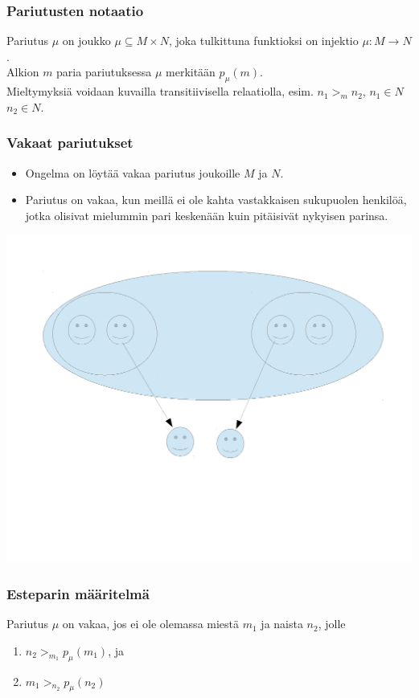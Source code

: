 \documentclass[table]{beamer}
\begin{document}
  \begin{frame}
  	\frametitle{Pariutusten notaatio}
  	\fontsize{14pt}{7.2}\selectfont
  	Pariutus $\mu$ on joukko $\mu \subseteq M \times N$, joka tulkittuna funktioksi on injektio $\mu: M \rightarrow N$. \\Alkion $m$ paria pariutuksessa $\mu$ merkitään $p_{\mu}(m)$. \\Mieltymyksiä voidaan kuvailla transitiivisella relaatiolla, esim. $n_1 >_{m} n_2$, $n_1 \in N$ $n_2 \in N$.
  \end{frame}
  \begin{frame}
    \frametitle{Vakaat pariutukset}
    \fontsize{14pt}{7.2}\selectfont
    \begin{itemize}
		\item Ongelma on löytää vakaa pariutus joukoille $M$ ja $N$.
		\item Pariutus on vakaa, kun meillä ei ole kahta vastakkaisen sukupuolen henkilöä, jotka olisivat mielummin pari keskenään kuin pitäisivät nykyisen parinsa. 
    \end{itemize}
    \includegraphics[scale=0.5]{epavakaa}
  \end{frame}
  \begin {frame}
  	\frametitle{Esteparin määritelmä}
  	\fontsize{18pt}{7.2}\selectfont
  	Pariutus $\mu$ on vakaa, jos ei ole olemassa miestä $m_{1}$ ja naista  $n_{2}$, jolle
  	\begin{enumerate}
  		\item $n_2 >_{m_{1}} p_{\mu}(m_1)$, ja
  		\item $m_1 >_{n_{2}} p_{\mu}(n_2)$
  	\end{enumerate}
  \end{frame}
\end{document}
